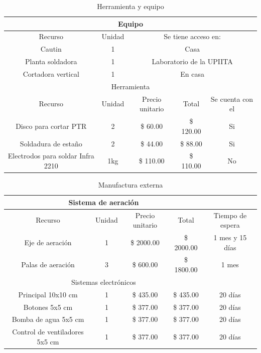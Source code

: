     \begin{table}[h]
        \begin{center}
            \caption{Herramienta y equipo}
            \begin{tabular}{ | c | c | c | c | c |}
               \multicolumn{5}{c}{Equipo}\\ \hline
                Recurso & Unidad & \multicolumn{3}{|c|}{Se tiene acceso en:}  \\ \hline
                Cautin & 1 & \multicolumn{3}{|c|}{Casa} \\ \hline
                Planta soldadora & 1 & \multicolumn{3}{|c|}{Laboratorio de la UPIITA} \\ \hline
                Cortadora vertical & 1 & \multicolumn{3}{|c|}{En casa} \\ \hline
                \multicolumn{5}{c}{Herramienta}\\ \hline
                Recurso & Unidad & Precio unitario & Total & Se cuenta con el  \\ \hline
                Disco para cortar PTR & 2 & \$ 60.00 & \$ 120.00 & Si \\ \hline
                Soldadura de estaño & 2  & \$ 44.00 & \$ 88.00 & Si \\ \hline
                Electrodos para soldar Infra 2210 & 1kg & \$ 110.00 & \$ 110.00 & No \\ \hline                
            \end{tabular}
            \label{tab:cost_herramientas}
        \end{center}
    \end{table}

    \begin{table}[h]
        \begin{center}
            \caption{Manufactura externa}
            \begin{tabular}{ | c | c | c | c | c |}
               \multicolumn{4}{c}{Sistema de aeración}\\ \hline
                Recurso & Unidad & Precio unitario & Total & Tiempo de espera  \\ \hline
                Eje de aeración & 1 & \$ 2000.00 & \$ 2000.00 & 1 mes y 15 días \\ \hline
                Palas de aeración & 3 & \$ 600.00 & \$ 1800.00 & 1 mes\\ \hline
                \multicolumn{4}{c}{Sistemas electrónicos}\\ \hline
                Principal 10x10 cm  & 1 & \$ 435.00 & \$ 435.00 & 20 días  \\ \hline
                Botones 5x5 cm  & 1 & \$ 377.00 & \$ 377.00 & 20 días  \\ \hline
                Bomba de agua 5x5 cm  & 1 & \$ 377.00 & \$ 377.00 & 20 días  \\ \hline
                Control de ventiladores 5x5 cm  & 1 & \$ 377.00 & \$ 377.00  & 20 días \\ \hline
            \end{tabular}
            \label{tab:cost_manodeobra}
        \end{center}
    \end{table}

